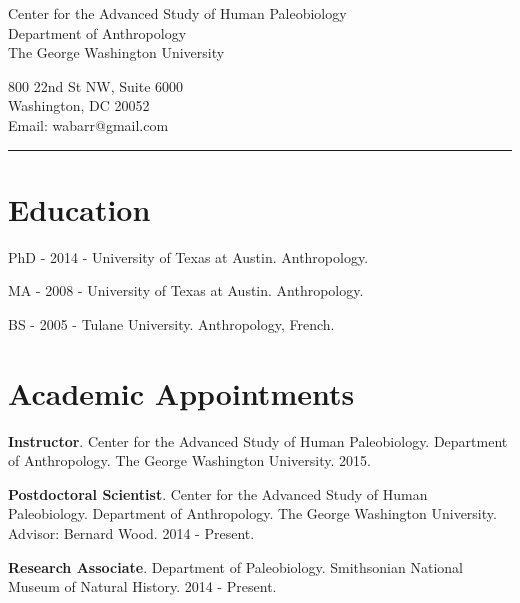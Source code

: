 \documentclass{article}
\begin{document}

\vspace{15pt}

\noindent\begin{minipage}{.60\textwidth}
\begin{flushleft}
Center for the Advanced Study of Human Paleobiology\\
Department of Anthropology\\
The George Washington University\\
\end{flushleft}
\end{minipage}
\begin{minipage}{.395\textwidth}
\begin{flushright}
800 22nd St NW, Suite 6000\\
Washington, DC 20052 \\
Email: wabarr@gmail.com\\
\end{flushright}
\end{minipage}


\noindent\rule[-2mm]{\textwidth}{1pt}

\section*{Education}
\begin{description*}
\item[] PhD - 2014 - University of Texas at Austin. Anthropology.
\item[] MA  - 2008 - University of Texas at Austin. Anthropology.
\item[] BS  - 2005 - Tulane University. Anthropology, French.
\end{description*}


\section*{Academic Appointments}
\begin{description*}
\item[] {\bfseries Instructor}. Center for the Advanced Study of Human Paleobiology. Department of Anthropology. The George Washington University. 2015.
\item[] {\bfseries Postdoctoral Scientist}. Center for the Advanced Study of Human Paleobiology. Department of Anthropology. The George Washington University. Advisor: Bernard Wood. 2014 - Present.
\item[] {\bfseries Research Associate}. Department of Paleobiology.  Smithsonian National Museum of Natural History. 2014 - Present.
\end{description*}
\end{document}
